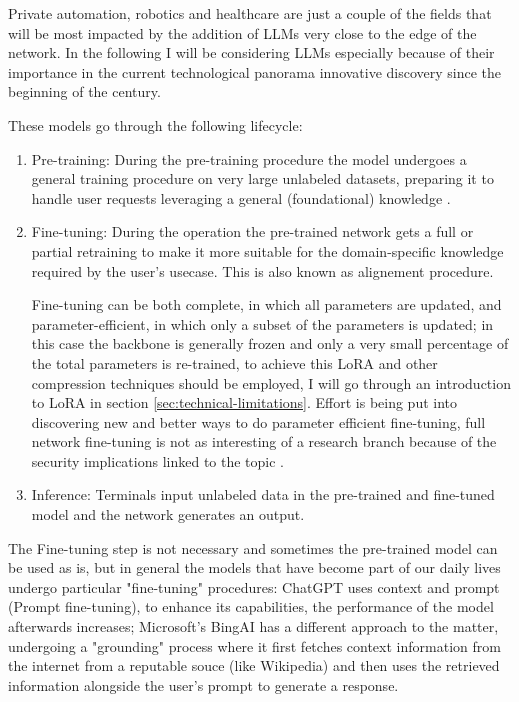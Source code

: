 Private automation, robotics and healthcare are just a couple of the fields that will be most
impacted by the addition of LLMs very close to the edge of the network. In the following I will be
considering LLMs especially because of their importance in the current technological panorama
innovative discovery since the beginning of the century.

\bigskip

These models go through the following lifecycle:
\begin{enumerate}
	\item Pre-training: During the pre-training procedure the model undergoes a general training
	      procedure on very large unlabeled datasets, preparing it to handle user requests
	      leveraging a general (foundational) knowledge \cite{gaisnet}.
	\item Fine-tuning: During the operation the pre-trained network gets a full or partial
	      retraining to make it more suitable for the domain-specific knowledge required by
	      the user's usecase. This is also known as alignement procedure.

	      Fine-tuning can be both complete, in which all parameters are updated,
	      and parameter-efficient, in which only a subset of the parameters is updated; in this case
		  the backbone is generally frozen and only a very small percentage of the total
	      parameters is re-trained, to achieve this LoRA and other compression techniques should be employed, I will go through an introduction to LoRA in section \ref{sec:technical-limitations}. Effort is being put into discovering new and better ways to do parameter efficient fine-tuning, full network fine-tuning is not as interesting of a research branch because of the security implications linked to the topic \cite{gaisnet}.

	\item Inference: Terminals input unlabeled data in the pre-trained and fine-tuned model and
	      the network generates an output.
\end{enumerate}

The Fine-tuning step is not necessary and sometimes the pre-trained model can be used as is, but in general the models that have become part of our daily lives undergo particular "fine-tuning" procedures: ChatGPT uses context and prompt (Prompt fine-tuning), to enhance its capabilities, the performance of the model afterwards increases\cite{openAI}; Microsoft's BingAI has a different approach to the matter, undergoing a "grounding" process where it first fetches context information from the internet from a reputable souce (like Wikipedia) and then uses the retrieved information alongside the user's prompt to generate a response\cite{zerotohero}.

